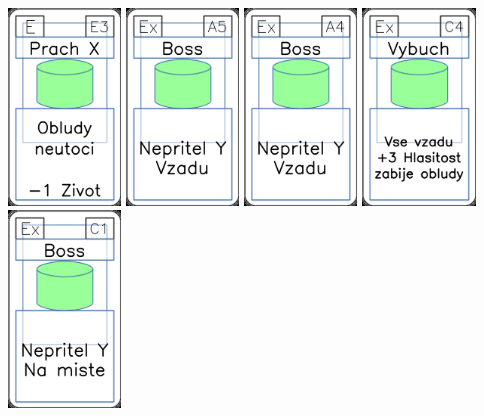 \documentclass[a4paper]{article}
\begin{document}
	\includegraphics[width=3.0cm]{img-4_52}
	\includegraphics[width=3.0cm]{img-4_4}
	\includegraphics[width=3.0cm]{img-4_3}
	\includegraphics[width=3.0cm]{img-4_13}
	\includegraphics[width=3.0cm]{img-4_10}
\end{document}
